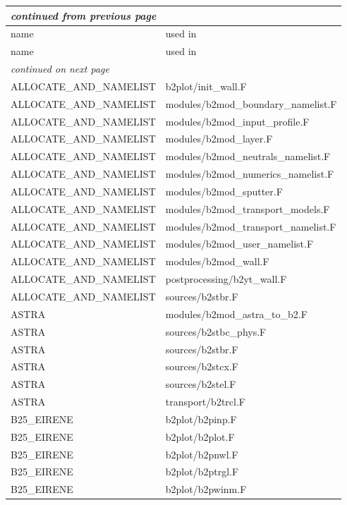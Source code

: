 \documentclass[a4paper,10pt]{report}
\begin{document}
\begin{center}
  \begin{longtable}{|l|l|}
    \hline
    \multicolumn{2}{|l|}{\small\sl continued from previous page} \\
    \hline name & used in \\
    \hline \endhead
    \hline name & used in \\
    \hline \endfirsthead
    \hline
    \multicolumn{2}{|l|}{\small\sl continued on next page} \\
    \hline \endfoot
    \endlastfoot
ALLOCATE\_AND\_NAMELIST & b2plot/init\_wall.F \\
ALLOCATE\_AND\_NAMELIST & modules/b2mod\_boundary\_namelist.F \\
ALLOCATE\_AND\_NAMELIST & modules/b2mod\_input\_profile.F \\
ALLOCATE\_AND\_NAMELIST & modules/b2mod\_layer.F \\
ALLOCATE\_AND\_NAMELIST & modules/b2mod\_neutrals\_namelist.F \\
ALLOCATE\_AND\_NAMELIST & modules/b2mod\_numerics\_namelist.F \\
ALLOCATE\_AND\_NAMELIST & modules/b2mod\_sputter.F \\
ALLOCATE\_AND\_NAMELIST & modules/b2mod\_transport\_models.F \\
ALLOCATE\_AND\_NAMELIST & modules/b2mod\_transport\_namelist.F \\
ALLOCATE\_AND\_NAMELIST & modules/b2mod\_user\_namelist.F \\
ALLOCATE\_AND\_NAMELIST & modules/b2mod\_wall.F \\
ALLOCATE\_AND\_NAMELIST & postprocessing/b2yt\_wall.F \\
ALLOCATE\_AND\_NAMELIST & sources/b2stbr.F \\
ASTRA & modules/b2mod\_astra\_to\_b2.F \\
ASTRA & sources/b2stbc\_phys.F \\
ASTRA & sources/b2stbr.F \\
ASTRA & sources/b2stcx.F \\
ASTRA & sources/b2stel.F \\
ASTRA & transport/b2trcl.F \\
B25\_EIRENE & b2plot/b2pinp.F \\
B25\_EIRENE & b2plot/b2plot.F \\
B25\_EIRENE & b2plot/b2pnwl.F \\
B25\_EIRENE & b2plot/b2ptrgl.F \\
B25\_EIRENE & b2plot/b2pwinm.F \\

\end{longtable}
\end{center}
\end{document}
